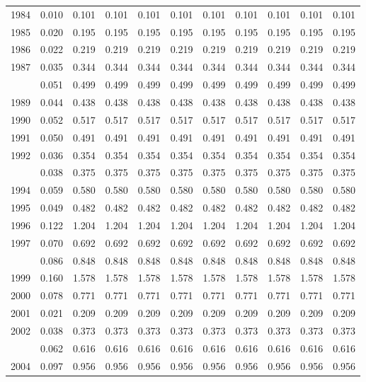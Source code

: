 \documentclass[
]{article}
\begin{document}
\begin{longtable}[t]{lrrrrrrrrrr}
1984 & 0.010 & 0.101 & 0.101 & 0.101 & 0.101 & 0.101 & 0.101 & 0.101 & 0.101 & 0.101\\
1985 & 0.020 & 0.195 & 0.195 & 0.195 & 0.195 & 0.195 & 0.195 & 0.195 & 0.195 & 0.195\\
1986 & 0.022 & 0.219 & 0.219 & 0.219 & 0.219 & 0.219 & 0.219 & 0.219 & 0.219 & 0.219\\
1987 & 0.035 & 0.344 & 0.344 & 0.344 & 0.344 & 0.344 & 0.344 & 0.344 & 0.344 & 0.344\\
\addlinespace
1988 & 0.051 & 0.499 & 0.499 & 0.499 & 0.499 & 0.499 & 0.499 & 0.499 & 0.499 & 0.499\\
1989 & 0.044 & 0.438 & 0.438 & 0.438 & 0.438 & 0.438 & 0.438 & 0.438 & 0.438 & 0.438\\
1990 & 0.052 & 0.517 & 0.517 & 0.517 & 0.517 & 0.517 & 0.517 & 0.517 & 0.517 & 0.517\\
1991 & 0.050 & 0.491 & 0.491 & 0.491 & 0.491 & 0.491 & 0.491 & 0.491 & 0.491 & 0.491\\
1992 & 0.036 & 0.354 & 0.354 & 0.354 & 0.354 & 0.354 & 0.354 & 0.354 & 0.354 & 0.354\\
\addlinespace
1993 & 0.038 & 0.375 & 0.375 & 0.375 & 0.375 & 0.375 & 0.375 & 0.375 & 0.375 & 0.375\\
1994 & 0.059 & 0.580 & 0.580 & 0.580 & 0.580 & 0.580 & 0.580 & 0.580 & 0.580 & 0.580\\
1995 & 0.049 & 0.482 & 0.482 & 0.482 & 0.482 & 0.482 & 0.482 & 0.482 & 0.482 & 0.482\\
1996 & 0.122 & 1.204 & 1.204 & 1.204 & 1.204 & 1.204 & 1.204 & 1.204 & 1.204 & 1.204\\
1997 & 0.070 & 0.692 & 0.692 & 0.692 & 0.692 & 0.692 & 0.692 & 0.692 & 0.692 & 0.692\\
\addlinespace
1998 & 0.086 & 0.848 & 0.848 & 0.848 & 0.848 & 0.848 & 0.848 & 0.848 & 0.848 & 0.848\\
1999 & 0.160 & 1.578 & 1.578 & 1.578 & 1.578 & 1.578 & 1.578 & 1.578 & 1.578 & 1.578\\
2000 & 0.078 & 0.771 & 0.771 & 0.771 & 0.771 & 0.771 & 0.771 & 0.771 & 0.771 & 0.771\\
2001 & 0.021 & 0.209 & 0.209 & 0.209 & 0.209 & 0.209 & 0.209 & 0.209 & 0.209 & 0.209\\
2002 & 0.038 & 0.373 & 0.373 & 0.373 & 0.373 & 0.373 & 0.373 & 0.373 & 0.373 & 0.373\\
\addlinespace
2003 & 0.062 & 0.616 & 0.616 & 0.616 & 0.616 & 0.616 & 0.616 & 0.616 & 0.616 & 0.616\\
2004 & 0.097 & 0.956 & 0.956 & 0.956 & 0.956 & 0.956 & 0.956 & 0.956 & 0.956 & 0.956\\

\end{longtable}
\end{document}

